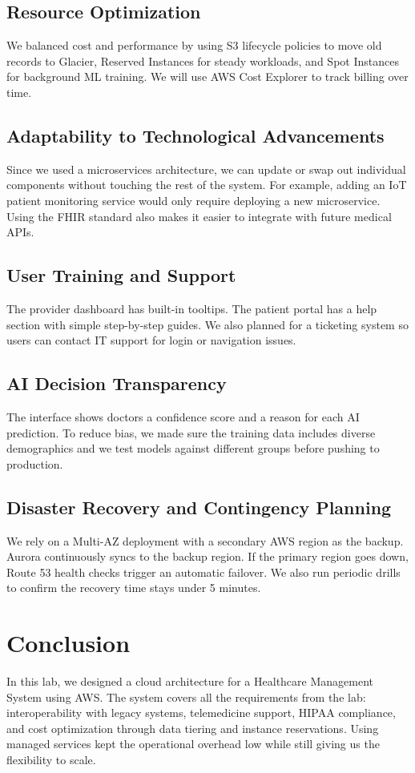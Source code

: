 \documentclass{article}
\begin{document}
\subsection{Resource Optimization}
We balanced cost and performance by using S3 lifecycle policies to move old records to Glacier, Reserved Instances for steady workloads, and Spot Instances for background ML training. We will use AWS Cost Explorer to track billing over time.

\subsection{Adaptability to Technological Advancements}
Since we used a microservices architecture, we can update or swap out individual components without touching the rest of the system. For example, adding an IoT patient monitoring service would only require deploying a new microservice. Using the FHIR standard also makes it easier to integrate with future medical APIs.

\subsection{User Training and Support}
The provider dashboard has built-in tooltips. The patient portal has a help section with simple step-by-step guides. We also planned for a ticketing system so users can contact IT support for login or navigation issues.

\subsection{AI Decision Transparency}
The interface shows doctors a confidence score and a reason for each AI prediction. To reduce bias, we made sure the training data includes diverse demographics and we test models against different groups before pushing to production.

\subsection{Disaster Recovery and Contingency Planning}
We rely on a Multi-AZ deployment with a secondary AWS region as the backup. Aurora continuously syncs to the backup region. If the primary region goes down, Route 53 health checks trigger an automatic failover. We also run periodic drills to confirm the recovery time stays under 5 minutes.

\section{Conclusion}

In this lab, we designed a cloud architecture for a Healthcare Management System using AWS. The system covers all the requirements from the lab: interoperability with legacy systems, telemedicine support, HIPAA compliance, and cost optimization through data tiering and instance reservations. Using managed services kept the operational overhead low while still giving us the flexibility to scale.
\end{document}
